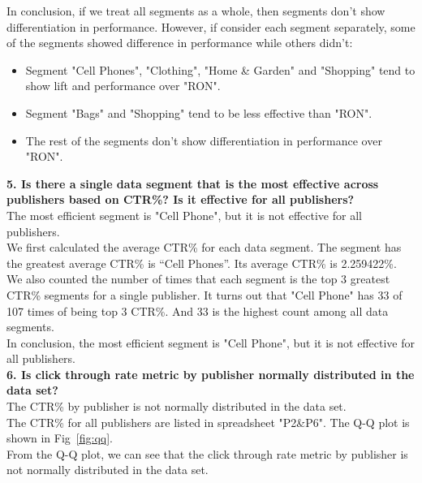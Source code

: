 \documentclass[12pt]{article}
\begin{document}
In conclusion, if we treat all segments as a whole, then segments don't show differentiation in performance. However, if consider each segment separately, some of the segments showed difference in performance while others didn't:

\begin{itemize}
  \item Segment "Cell Phones", "Clothing", "Home \& Garden" and "Shopping" tend to show lift and performance over "RON".
  \item Segment "Bags" and "Shopping" tend to be less effective than "RON".
  \item The rest of the segments don't show differentiation in performance over "RON".
\end{itemize}

{\bf 5.	Is there a single data segment that is the most effective across publishers based on CTR\%? Is it effective for all publishers?} \\

The most efficient segment is "Cell Phone", but it is not effective for all publishers. \\

We first calculated the average CTR\% for each data segment. The segment has the greatest average CTR\% is ``Cell Phones''. Its average CTR\% is 2.259422\%. \\

We also counted the number of times that each segment is the top 3 greatest CTR\% segments for a single publisher. It turns out that "Cell Phone" has 33 of 107 times of being top 3 CTR\%. And 33 is the highest count among all data segments. \\

In conclusion, the most efficient segment is "Cell Phone", but it is not effective for all publishers. \\

{\bf 6. Is click through rate metric by publisher normally distributed in the data set?} \\

The CTR\% by publisher is not normally distributed in the data set. \\

The CTR\% for all publishers are listed in spreadsheet "P2\&P6". The Q-Q plot is shown in Fig~\ref{fig:qq}. \\

From the Q-Q plot, we can see that the click through rate metric by publisher is not normally distributed in the data set. \\
\end{document}

